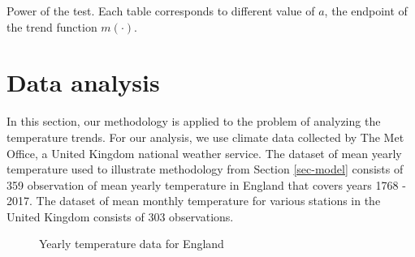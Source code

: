 \begin{center}
Power of the test. Each table corresponds to different value of $a$, the endpoint of the trend function $m(\cdot)$.\\
\begin{minipage}{.45\textwidth}
\begin{table}[H]
    \begin{center}
        \caption{$a = 0.25$}
        \label{tab:power_025_ll}
        \centering
        
    \end{center}
\end{table}

\end{minipage}
\begin{minipage}{.45\textwidth}

\begin{table}[H]
    \begin{center}
        \caption{$a = 0.50$}
        \label{tab:power_050_ll}
        \centering
        
    \end{center}
\end{table}
\end{minipage}


\begin{minipage}{.45\textwidth}
\begin{table}[H]
    \begin{center}
        \caption{$a = 0.65$}
        \label{tab:power_065_ll}
        \centering
        
    \end{center}
\end{table}
\end{minipage}
\begin{minipage}{.45\textwidth}
\begin{table}[H]
    \begin{center}
        \caption{$a = 0.75$}
        \label{tab:power_075_ll}
        \centering
        
    \end{center}
\end{table}
\end{minipage}

\end{center}


\newpage
\section{Data analysis}\label{sec-data}
In this section, our methodology is applied to the problem of analyzing the temperature trends. For our analysis, we use climate data collected by The Met Office, a United Kingdom national weather service. The dataset of mean yearly temperature used to illustrate methodology from Section \ref{sec-model} consists of 359 observation of mean yearly temperature in England that covers years 1768 - 2017. The dataset of mean monthly temperature for various stations in the United Kingdom consists of 303 observations. 

\begin{figure}[ht!]
\centering

\caption{Yearly temperature data for England\label{yearly_data}}
\end{figure}

